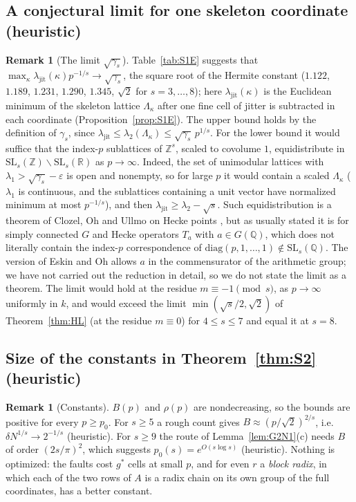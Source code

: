 \documentclass[11pt]{amsart}
\theoremstyle{definition}
\newtheorem{remark}[theorem]{Remark}
\theoremstyle{plain}
\newcommand{\Z}{\mathbb{Z}}
\providecommand{\R}{\mathbb{R}}
\begin{document}
\subsection{A conjectural limit for one skeleton coordinate (heuristic)}
\begin{remark}[The limit $\sqrt{\gamma_s}$]\label{rem:S1Elim}
Table~\ref{tab:S1E} suggests that $\max_\kappa\lambda_{\mathrm{jit}}(\kappa)p^{-1/s}\to\sqrt{\gamma_s}$, the square root of the Hermite constant ($1.122$, $1.189$, $1.231$, $1.290$, $1.345$, $\sqrt2$ for $s=3,\dots,8$); here $\lambda_{\mathrm{jit}}(\kappa)$ is the Euclidean minimum of the skeleton lattice $\Lambda_\kappa$ after one fine cell of jitter is subtracted in each coordinate (Proposition~\ref{prop:S1E}). The upper bound holds by the definition of $\gamma_s$, since $\lambda_{\mathrm{jit}}\le\lambda_2(\Lambda_\kappa)\le\sqrt{\gamma_s}\,p^{1/s}$. For the lower bound it would suffice that the index-$p$ sublattices of $\Z^s$, scaled to covolume $1$, equidistribute in $\mathrm{SL}_s(\Z)\backslash\mathrm{SL}_s(\R)$ as $p\to\infty$. Indeed, the set of unimodular lattices with $\lambda_1>\sqrt{\gamma_s}-\varepsilon$ is open and nonempty, so for large $p$ it would contain a scaled $\Lambda_\kappa$ ($\lambda_1$ is continuous, and the sublattices containing a unit vector have normalized minimum at most $p^{-1/s}$), and then $\lambda_{\mathrm{jit}}\ge\lambda_2-\sqrt s$. Such equidistribution is a theorem of Clozel, Oh and Ullmo on Hecke points \cite{COU01}, but as usually stated it is for simply connected $G$ and Hecke operators $T_a$ with $a\in G(\mathbb Q)$, which does not literally contain the index-$p$ correspondence of $\mathrm{diag}(p,1,\dots,1)\notin\mathrm{SL}_s(\mathbb Q)$. The version of Eskin and Oh \cite[Thm.~1.2]{EO06} allows $a$ in the commensurator of the arithmetic group; we have not carried out the reduction in detail, so we do not state the limit as a theorem. The limit would hold at the residue $m\equiv-1\pmod s$, as $p\to\infty$ uniformly in $k$, and would exceed the limit $\min(\sqrt s/2,\sqrt2)$ of Theorem~\ref{thm:HL} (at the residue $m\equiv0$) for $4\le s\le7$ and equal it at $s=8$.
\end{remark}

\subsection{Size of the constants in Theorem~\ref{thm:S2} (heuristic)}
\begin{remark}[Constants]\label{rem:skelconst}
$B(p)$ and $\rho(p)$ are nondecreasing, so the bounds are positive for every $p\ge p_0$. For $s\ge5$ a rough count gives $B\approx(p/\sqrt2)^{2/s}$, i.e. $\delta N^{1/s}\to2^{-1/s}$ (heuristic). For $s\ge9$ the route of Lemma~\ref{lem:G2N1}(c) needs $B$ of order $(2s/\pi)^2$, which suggests $p_0(s)=e^{O(s\log s)}$ (heuristic). Nothing is optimized: the faults cost $g^*$ cells at small $p$, and for even $r$ a \emph{block radix}, in which each of the two rows of $A$ is a radix chain on its own group of the full coordinates, has a better constant.
\end{remark}
\end{document}
